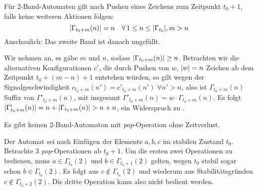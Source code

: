 \documentclass{article}
\begin{document}
\begin{lemma}
    \label{lem:2tape-halffilled}
    Für 2-Band-Automaten gilt nach Pushen eines Zeichens zum Zeitpunkt $t_0 + 1$, falls keine weiteren Aktionen folgen:
    \[ \lvert\Gamma_{t_0+m}(n)\rvert = n \quad\forall\, 1 \leq n \leq \lvert\Gamma_{t_0}\rvert,m > n \]
    Anschaulich: Das zweite Band ist danach ungefüllt.
    \begin{beweis}
        Wir nehmen an, es gäbe $m$ und $n$, sodass $\lvert\Gamma_{t_0+m}(n)\rvert \geq n$. Betrachten wir die alternativen Konfigurationen $c'$, die durch Pushen von $w$, $\lvert w\rvert=n$ Zeichen ab dem Zeitpunkt $t_0+(m-n)+1$ entstehen würden, so gilt wegen der Signalgeschwindigkeit $c_{t_0+m}(n') = c'_{t_0+m}(n') \;\forall n' > n$, also ist $\Gamma_{t_0+m}(n)$ Suffix von $\Gamma'_{t_0+m}(n)$, mit  insgesamt $\Gamma'_{t_0+m}(n) = w \cdot \Gamma_{t_0+m}(n)$. Es folgt $\lvert\Gamma'_{t_0+m}(n)\rvert = n + \lvert\Gamma_{t_0+m}(n)\rvert > n + n$, ein Widerspruch zu .
    \end{beweis}
\end{lemma}

\begin{satz}
    Es gibt keinen 2-Band-Automaton mit \emph{pop}-Operation ohne Zeitverlust.
    \begin{beweis}
        Der Automat sei nach Einfügen der Elemente $a, b, c$ im stabilen Zustand $t_0$. Betrachte 3 \emph{pop}-Operationen ab $t_0+1$. Um die ersten zwei Operationen zu bedienen, muss $a \in \Gamma_{t_0}(2)$ und $b \in \Gamma_{t_0+1}(2)$ gelten, wegen $t_0$ stabil sogar schon $b \in \Gamma_{t_0}(2)$. Es folgt aus  $c \notin \Gamma_{t_0}(2)$ und wiederum aus Stabilitätsgründen $c \notin \Gamma_{t_0+2}(2)$. Die dritte Operation kann also nicht bedient werden.
    \end{beweis}
\end{satz}
\end{document}
